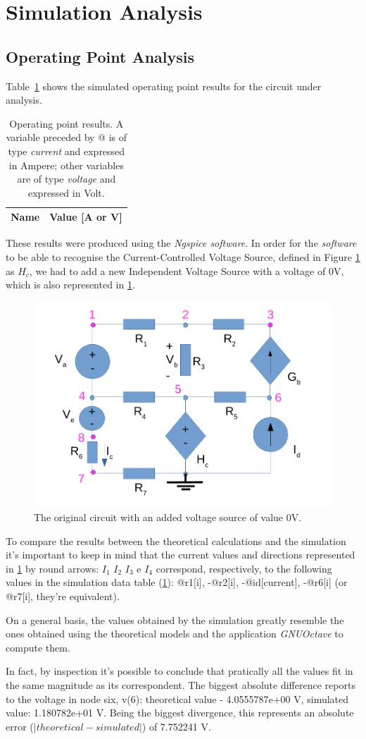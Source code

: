 \section{Simulation Analysis}
\label{sec:simulation}

\subsection{Operating Point Analysis}

Table~\ref{tab:op} shows the simulated operating point results for the circuit under analysis.

\begin{table}[htb!]
  \centering
  \begin{tabular}{|l|r|}
    \hline    
    {\bf Name} & {\bf Value [A or V]} \\ \hline
    
  \end{tabular}
  \caption{Operating point results. A variable preceded by @ is of type {\em current}
    and expressed in Ampere; other variables are of type {\it voltage} and expressed in
    Volt.}
  \label{tab:op}
\end{table}

These results were produced using the \textit{Ngspice software}. In order for the \textit{software} to be able to recognise the Current-Controlled Voltage Source, defined in Figure \ref{fig2} as $H_c$, we had to add a new Independent Voltage Source with a voltage of 0V, which is also represented in \ref{fig2}.


\begin{figure}[h] \centering
\includegraphics[width=0.4\linewidth]{t1-2.pdf}
\caption{The original circuit with an added voltage source of value 0V.}
\label{fig2}
\end{figure}


To compare the results between the theoretical calculations and the simulation it's important to keep in mind that the current values and directions represented in \ref{fig2} by round arrows: $I_1$ $I_2$ $I_3$ e $I_4$ correspond, respectively, to the following values in the simulation data table (\ref{tab:op}): @r1[i], -@r2[i], -@id[current], -@r6[i] (or @r7[i], they're equivalent).


On a general basis, the values obtained by the simulation greatly resemble the ones obtained using the theoretical models and the application \textit{GNUOctave} to compute them.

In fact, by inspection it's possible to conclude that pratically all the values fit in the same magnitude as its correspondent. The biggest absolute difference reports to the voltage in node six, v(6): theoretical value - 4.0555787e+00 V, simulated value: 1.180782e+01 V. Being the biggest divergence, this represents an absolute error ($|theoretical - simulated|$) of 7.752241 V.